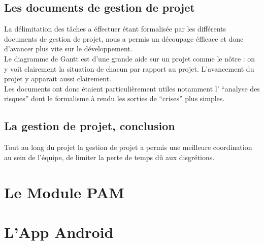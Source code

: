 \subsection{Les documents de gestion de projet}

La délimitation des tâches a éffectuer étant formalisée par les différents documents de gestion de projet, nous a permis un découpage éfficace et donc d'avancer plus vite sur le développement.\\

Le diagramme de Gantt est d'une grande aide sur un projet comme le nôtre : on y voit clairement la situation de chacun par rapport au projet. L'avancement du projet y apparait aussi clairement.\\

Les documents ont donc étaient particulièrement utiles notamment l' ``analyse des risques'' dont le formalisme à rendu les sorties de ``crises'' plus simples.\\

\subsection{La gestion de projet, conclusion}

Tout au long du projet la gestion de projet a permis une meilleure coordination au sein de l'équipe, de limiter la perte de temps dû aux disgrétions.\\



\section{Le Module PAM}

\section{L'App Android}
